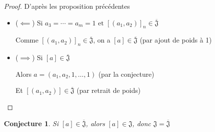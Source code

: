 \documentclass{article}
\newtheorem{conjecture}{Conjecture}
\begin{document}
\begin{proof} D'après les proposition précédentes
    \begin{itemize}
        \item ($\impliedby$) Si $a_3 = \cdots = a_m = 1 \text{ et } {[(a_1, a_2)]}_n \in \overline{\mathfrak{J}}$
        
            Comme ${[(a_1, a_2)]}_n \in \overline{\mathfrak{J}}$, on a $[a] \in \overline{\mathfrak{J}}$ (par ajout de poids à 1)
        \item ($\implies$) Si $[a] \in \overline{\mathfrak{J}}$

            Alors $a = (a_1, a_2, 1, \dots, 1)$  (par la conjecture)

            Et $[(a_1, a_2)] \in \overline{\mathfrak{J}}$ (par retrait de poids)
    \end{itemize}
\end{proof}

\begin{conjecture}
    Si $[a] \in \overline{\mathfrak{J}}$, alors $[a] \in \mathfrak{J}$, donc $\mathfrak{J} = \overline{\mathfrak{J}}$
\end{conjecture}
\end{document}
